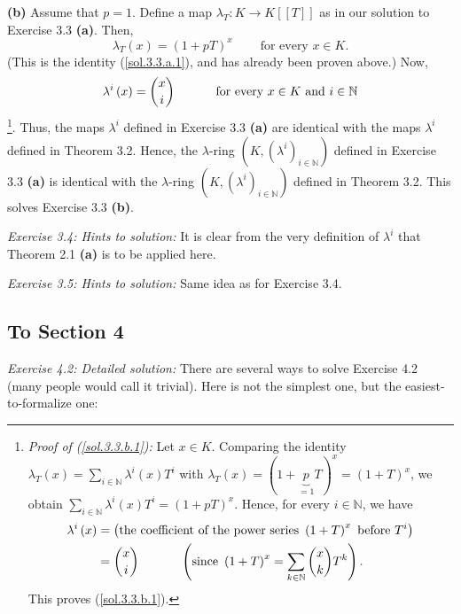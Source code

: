 \documentclass[numbers=enddot,12pt,final,onecolumn,notitlepage]{scrartcl}%
\begin{document}
\textbf{(b)} Assume that $p=1$. Define a map $\lambda_{T}:K\rightarrow
K\left[  \left[  T\right]  \right]  $ as in our solution to Exercise 3.3
\textbf{(a)}. Then,%
\[
\lambda_{T}\left(  x\right)  =\left(  1+pT\right)  ^{x}%
\ \ \ \ \ \ \ \ \ \ \text{for every }x\in K.
\]
(This is the identity (\ref{sol.3.3.a.1}), and has already been proven above.)
Now,%
\begin{equation}
\lambda^{i}\left(  x\right)  =\dbinom{x}{i}\ \ \ \ \ \ \ \ \ \ \text{for every
}x\in K\text{ and }i\in\mathbb{N} \label{sol.3.3.b.1}%
\end{equation}
\footnote{\textit{Proof of (\ref{sol.3.3.b.1}):} Let $x\in K$. Comparing the
identity $\lambda_{T}\left(  x\right)  =\sum_{i\in\mathbb{N}}\lambda
^{i}\left(  x\right)  T^{i}$ with $\lambda_{T}\left(  x\right)  =\left(
1+\underbrace{p}_{=1}T\right)  ^{x}=\left(  1+T\right)  ^{x}$, we obtain
$\sum_{i\in\mathbb{N}}\lambda^{i}\left(  x\right)  T^{i}=\left(  1+pT\right)
^{x}$. Hence, for every $i\in\mathbb{N}$, we have%
\begin{align*}
\lambda^{i}\left(  x\right)   &  =\left(  \text{the coefficient of the power
series }\left(  1+T\right)  ^{x}\text{ before }T^{i}\right) \\
&  =\dbinom{x}{i}\ \ \ \ \ \ \ \ \ \ \left(  \text{since }\left(  1+T\right)
^{x}=\sum_{k\in\mathbb{N}}\dbinom{x}{k}T^{k}\right)  .
\end{align*}
This proves (\ref{sol.3.3.b.1}).}. Thus, the maps $\lambda^{i}$ defined in
Exercise 3.3 \textbf{(a)} are identical with the maps $\lambda^{i}$ defined in
Theorem 3.2. Hence, the $\lambda$-ring $\left(  K,\left(  \lambda^{i}\right)
_{i\in\mathbb{N}}\right)  $ defined in Exercise 3.3 \textbf{(a)} is identical
with the $\lambda$-ring $\left(  K,\left(  \lambda^{i}\right)  _{i\in
\mathbb{N}}\right)  $ defined in Theorem 3.2. This solves Exercise 3.3
\textbf{(b)}.

\textit{Exercise 3.4: Hints to solution:} It is clear from the very definition
of $\lambda^{i}$ that Theorem 2.1 \textbf{(a)} is to be applied here.

\textit{Exercise 3.5: Hints to solution:} Same idea as for Exercise 3.4.

\subsection{To Section 4}

\textit{Exercise 4.2: Detailed solution:} There are several ways to solve
Exercise 4.2 (many people would call it trivial). Here is not the simplest
one, but the easiest-to-formalize one:
\end{document}
